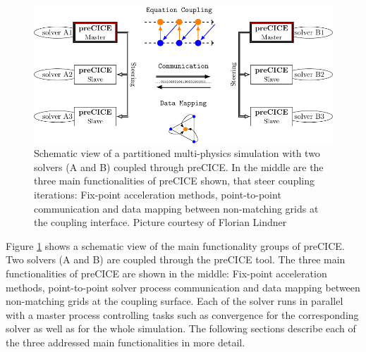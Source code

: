  \begin{figure}[htbp]
  	\centering
  	\includegraphics[width=0.97\linewidth]{figures/NewCommunicationScheme}
  	\caption{Schematic view of a partitioned multi-physics simulation with two solvers (A and B) coupled through preCICE. In the middle are the three main functionalities of preCICE shown, that steer coupling iterations: Fix-point acceleration methods, point-to-point communication and data mapping between non-matching grids at the coupling interface. Picture courtesy of Florian Lindner \cite{bungartz2015fully} }
  	\label{fig:precice}
  \end{figure}
  
  Figure \ref{fig:precice} shows a schematic view of the main functionality groups of preCICE. Two solvers (A and B) are coupled through the preCICE tool. The three main functionalities of preCICE are shown in the middle: Fix-point acceleration methods, point-to-point solver process communication and data mapping between non-matching grids at the coupling surface. Each of the solver runs in parallel with a master process controlling tasks such as convergence for the corresponding solver as well as for the whole simulation. The following sections describe each of the three addressed main functionalities in more detail.
  
 
